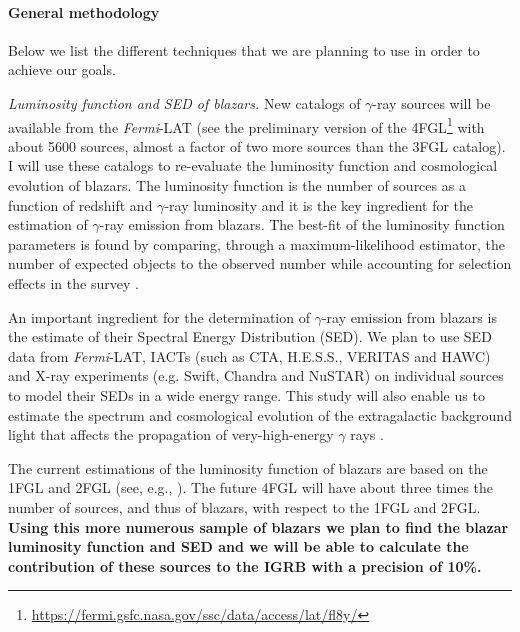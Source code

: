 \documentclass[12 pt]{article}
\newcommand{\FIXME}[1]{{\color{red}{\em Comment: }{#1}}}
\begin{document}
\vspace{-0.5cm}
\paragraph{General methodology} 
\label{sec:methodology}
Below we list the different techniques that we are planning to use in order to achieve our goals.  

{\it Luminosity function and SED of blazars.}
New catalogs of $\gamma$-ray sources will be available from the {\it Fermi}-LAT (see the preliminary version of the 4FGL\footnote{\url{https://fermi.gsfc.nasa.gov/ssc/data/access/lat/fl8y/}} with about 5600 sources, almost a factor of two more sources than the 3FGL catalog).
I will use these catalogs to re-evaluate the luminosity function and cosmological evolution of blazars.
The luminosity function is the number of sources as a function of redshift and $\gamma$-ray luminosity and it is the key ingredient for the estimation of $\gamma$-ray emission from blazars.
The best-fit of the luminosity function parameters is found by comparing, through a maximum-likelihood estimator, the number of expected objects to the observed number while accounting for selection effects in the survey \cite{2012ApJ...751..108A}. 

An important ingredient for the determination of $\gamma$-ray emission from blazars is the estimate of their Spectral Energy Distribution (SED).
We plan to use SED data from {\it Fermi}-LAT, IACTs (such as CTA, H.E.S.S., VERITAS and HAWC) and X-ray experiments (e.g. Swift, Chandra and NuSTAR) on individual sources to model their SEDs in a wide energy range.
This study will also enable us to estimate the spectrum and cosmological evolution of the extragalactic background light that affects the propagation of very-high-energy $\gamma$ rays \cite{2012Sci...338.1190A}.

The current estimations of the luminosity function of blazars are based on the 1FGL and 2FGL (see, e.g., \cite{2012ApJ...751..108A,Ajello:2015mfa,DiMauro:2013zfa}).
The future 4FGL will have about three times the number of sources, and thus of blazars, with respect to the 1FGL and 2FGL. 
{\bf Using this more numerous sample of blazars we plan to find the blazar luminosity function and SED and we will be able to calculate the contribution of these sources to the IGRB with a precision of 10\%.}
\end{document}
